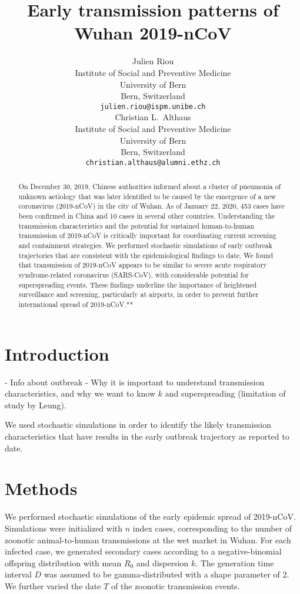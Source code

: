 \documentclass{article}
\title{Early transmission patterns of Wuhan 2019-nCoV}
\author{
   Julien Riou \\
  Institute of Social and Preventive Medicine\\
  University of Bern\\
  Bern, Switzerland \\
  \texttt{julien.riou@ispm.unibe.ch} \\
  \And
Christian L.~Althaus \\
Institute of Social and Preventive Medicine\\
University of Bern\\
Bern, Switzerland \\
\texttt{christian.althaus@alumni.ethz.ch}
}
\begin{document}
\maketitle

\begin{abstract}
On December 30, 2019, Chinese authorities informed about a cluster of pneumonia of unknown aetiology that was later identified to be caused by the emergence of a new coronavirus (2019-nCoV) in the city of Wuhan. As of January 22, 2020, 453 cases have been confirmed in China and 10 cases in several other countries. Understanding the transmission characteristics and the potential for sustained human-to-human transmission of 2019-nCoV is critically important for coordinating current screening and containment strategies. We performed stochastic simulations of early outbreak trajectories that are consistent with the epidemiological findings to date. We found that transmission of 2019-nCoV appears to be similar to severe acute respiratory syndrome-related coronavirus (SARS-CoV), with considerable potential for superspreading events. These findings underline the importance of heightened surveillance and screening, particularly at airports, in order to prevent further international spread of 2019-nCoV.**

\end{abstract}




\section{Introduction}

- Info about outbreak
- Why it is important to understand transmission characteristics, and why we want to know $k$ and superspreading (limitation of study by Leung).

We used stochastic simulations in order to identify the likely transmission characteristics that have results in the early outbreak trajectory as reported to date.

\section{Methods}
We performed stochastic simulations of the early epidemic spread of 2019-nCoV. Simulations were initialized with $n$ index cases, corresponding to the number of zoonotic animal-to-human transmissions at the wet market in Wuhan. For each infected case, we generated secondary cases according to a negative-binomial offspring distribution with mean $R_0$ and dispersion $k$. The generation time interval $D$ was assumed to be gamma-distributed with a shape parameter of 2. We further varied the date $T$ of the zoonotic transmission events.
\end{document}
